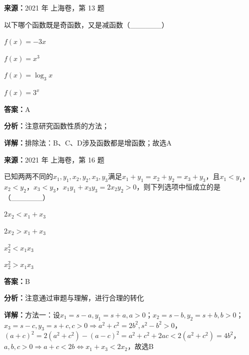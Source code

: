 \begin{question}[points=5]
\textbf{来源：}2021 年 上海卷，第 13 题\par
以下哪个函数既是奇函数，又是减函数（\_\_\_\_\_\_）
\begin{choices}
  \item $f(x)=-3x$
  \item $f(x)=x^3$
  \item $f(x)=\log_3x$
  \item $f(x)=3^x$
\end{choices}
\begin{solution}
\textbf{答案：}A

\textbf{分析：}注意研究函数性质的方法；

\textbf{详解：}排除法：B、C、D涉及函数都是增函数；故选A
\end{solution}
\end{question}

\begin{question}[points=5]
\textbf{来源：}2021 年 上海卷，第 16 题\par
已知两两不同的$x_1,y_1,x_2,y_2,x_3,y_3$满足$x_1+y_1=x_2+y_2=x_3+y_3$，且$x_1<y_1$，$x_2<y_2$，$x_3<y_3$，$x_1y_1+x_3y_3=2x_2y_2>0$，则下列选项中恒成立的是（\_\_\_\_\_\_）
\begin{choices}
  \item $2x_2<x_1+x_3$
  \item $2x_2>x_1+x_3$
  \item $x_2^2<x_1x_3$
  \item $x_2^2>x_1x_3$
\end{choices}
\begin{solution}
\textbf{答案：}B

\textbf{分析：}注意通过审题与理解，进行合理的转化

\textbf{详解：}方法一：设$x_1=s-a, y_1=s+a, a>0$；$x_2=s-b, y_2=s+b, b>0$；$x_3=s-c, y_3=s+c, c>0\Rightarrow a^2+c^2=2b^2, s^2-b^2>0$，$(a+c)^2=2(a^2+c^2)-(a-c)^2=a^2+c^2+2ac<2(a^2+c^2)=4b^2$，$a,b,c>0\Rightarrow a+c<2b\Leftrightarrow x_1+x_3<2x_2$，故选B
\end{solution}
\end{question}


